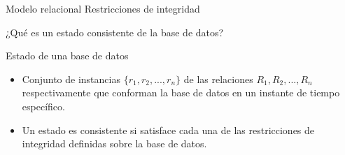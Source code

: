 \begin{frame}{Modelo relacional}
    \centering
    \Huge \textcolor{blue3}{Restricciones de integridad}
\end{frame}


\begin{frame}{¿Qu\'e es un estado consistente de la base de datos?}
    \begin{block}{Estado de una base de datos}
        \begin{itemize}
            \item  Conjunto de instancias $\{r_1,r_2,...,r_n\}$ de las relaciones $R_1,R_2,...,R_n$ respectivamente
            que conforman la base de datos en un instante de tiempo espec\'ifico.
            \item<2>  Un estado es consistente si satisface cada una de las restricciones de integridad
            definidas sobre la base de datos.
        \end{itemize}
       
    \end{block}
\end{frame}



          


